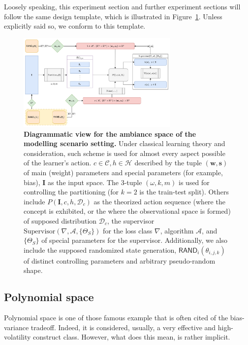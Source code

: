\documentclass[10pt]{article}
\begin{document}
Loosely speaking, this experiment section and further experiment sections will follow the same design template, which is illustrated in Figure~\ref{fig:vapnik_scheme}. Unless explicitly said so, we conform to this template. 
\begin{figure}[htb]
  \centering
  \includegraphics[width=0.7\textwidth]{Diagramatic_Modelling_View.png}
  \caption{\textbf{Diagrammatic view for the ambiance space of the modelling scenario setting.} Under classical learning theory and consideration, such scheme is used for almost every aspect possible of the learner's action. $c\in\mathcal{C}, h\in \mathcal{H}$ described by the tuple $(\mathbf{w},\mathbf{s})$ of main (weight) parameters and special parameters (for example, bias), $\mathbf{I}$ as the input space. The 3-tuple $(\omega, k,m)$ is used for controlling the partitioning (for $k=2$ is the train-test split). Others include $P(\mathbf{I},c,h,\mathcal{D}_{c})$ as the theorized action sequence (where the concept is exhibited, or the where the observational space is formed) of supposed distribution $\mathcal{D}_{c}$, the supervisor $\text{Supervisor}(\nabla, \mathcal{A}, \{\Theta_{S}\})$ for the loss class $\nabla$, algorithm $\mathcal{A}$, and $\{\Theta_{S}\}$ of special parameters for the supervisor. Additionally, we also include the supposed randomized state generation, $\mathsf{RAND}_{i}(\theta_{i,j,k})$ of distinct controlling parameters and arbitrary pseudo-random shape.}
  \label{fig:vapnik_scheme}
\end{figure}

\subsection{Polynomial space}

Polynomial space is one of those famous example that is often cited of the bias-variance tradeoff. Indeed, it is considered, usually, a very effective and high-volatility construct class. However, what does this mean, is rather implicit. 
\end{document}
